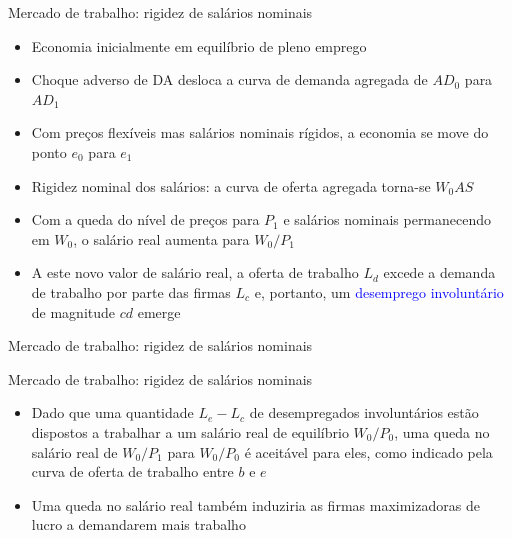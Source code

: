 \documentclass[10pt]{beamer}
\begin{document}
\begin{frame}{Mercado de trabalho: rigidez de salários nominais}
    \begin{itemize}
        \item Economia inicialmente em equilíbrio de pleno emprego
        \bigskip
        \item Choque adverso de DA desloca a curva de demanda agregada de $AD_0$ para $AD_1$
        \bigskip
        \item Com preços flexíveis mas salários nominais rígidos, a economia se move do ponto $e_0$ para $e_1$
        \bigskip
        \item Rigidez nominal dos salários: a curva de oferta agregada torna-se $W_0AS$
        \bigskip
        \item Com a queda do nível de preços para $P_1$ e salários nominais permanecendo em $W_0$, o salário real aumenta para $W_0/P_1$
        \bigskip
        \item A este novo valor de salário real, a oferta de trabalho $L_d$ excede a demanda de trabalho por parte das firmas $L_c$ e, portanto, um \textcolor{blue}{desemprego involuntário} de magnitude $cd$ emerge
    \end{itemize}
\end{frame}

\begin{frame}{Mercado de trabalho: rigidez de salários nominais}
\end{frame}

\begin{frame}{Mercado de trabalho: rigidez de salários nominais}
    \begin{itemize}
        \item Dado que uma quantidade $L_e - L_c$ de desempregados involuntários estão dispostos a trabalhar a um salário real de equilíbrio $W_0/P_0$, uma queda no salário real de $W_0/P_1$ para $W_0/P_0$ é aceitável para eles, como indicado pela curva de oferta de trabalho entre $b$ e $e$
        \bigskip
        \item Uma queda no salário real também induziria as firmas maximizadoras de lucro a demandarem mais trabalho
    \end{itemize}
\end{frame}
\end{document}
